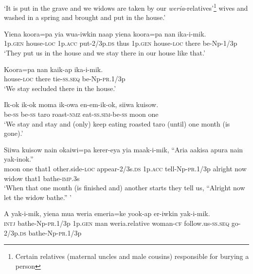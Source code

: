 \glt ‘It is put in the grave and we widows are taken by our \textit{weria}{}-relatives’\footnote{ Certain relatives (maternal uncles and male cousins) responsible for burying a person} wives and washed in a spring and brought and put in the house.’ \\
\z


\ea\label{ex:a:x5}
\gll  Yiena  koora=pa  yia  wua-iwkin  naap  yiena  koora=pa      nan  ika-i-mik. \\
1p.\textsc{gen}  house-\textsc{loc}  1p.\textsc{acc}  put-2/3p.\textsc{ds}  thus  1p.\textsc{gen}  house-\textsc{loc}   there  be-Np-1/3p \\


\glt ‘They put us in the house and we stay there in our house like that.’ \\
\z


\ea\label{ex:a:x6}
\gll  Koora=pa  nan  kaik-ap  ika-i-mik. \\
house-\textsc{loc}  there  tie-\textsc{ss.seq}  be-Np-\textsc{pr}.1/3p \\
\glt ‘We stay secluded there in the house.’ \\
\z


\ea\label{ex:a:x7}
\gll  Ik-ok  ik-ok  moma  ik-owa  en-em-ik-ok,  siiwa  kuisow. \\
be-\textsc{ss}  be-\textsc{ss}  taro  roast-\textsc{nmz}  eat-\textsc{ss}.\textsc{sim}-be-\textsc{ss}  moon  one \\
\glt ‘We stay and stay and (only) keep eating roasted taro (until) one month (is gone).’ \\
\z


\ea\label{ex:a:x8}
\gll  Siiwa  kuisow  nain  okaiwi=pa  kerer-eya  yia  maak-i-mik,           “Aria  aakisa  apura  nain  yak-inok.” \\
moon  one  that1  other.side-\textsc{loc}  appear-2/3s.\textsc{ds}  1p.\textsc{acc}  tell-Np-\textsc{pr}.1/3p   alright  now  widow  that1  bathe-\textsc{imp}.3s \\


\glt ‘When that one month (is finished and) another starts they tell us, “Alright now let the widow bathe.” ’ \\
\z


\ea\label{ex:a:x9}
\gll  A  yak-i-mik,  yiena  mua  weria  emeria=ke             yook-ap  er-iwkin  yak-i-mik. \\
\textsc{intj}  bathe-Np-\textsc{pr}.1/3p  1p.\textsc{gen}  man  weria.relative  woman-\textsc{cf} follow.us-\textsc{ss.seq}  go-2/3p.\textsc{ds}  bathe-Np-\textsc{pr}.1/3p \\


